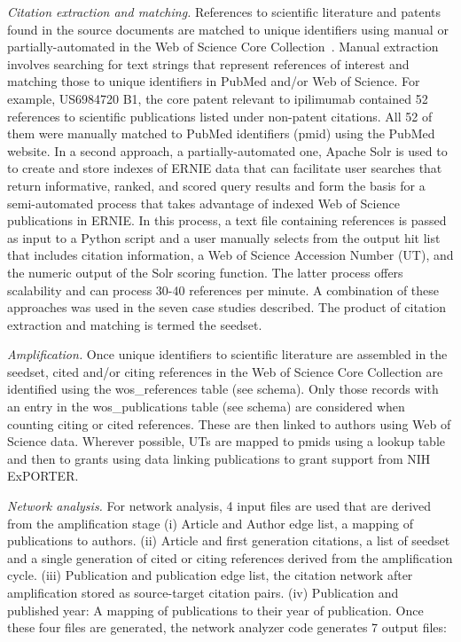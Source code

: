 \documentclass[review]{elsarticle}
\begin{document}
\emph {Citation extraction and matching.} References to scientific literature and patents found in the source documents are matched to unique identifiers using manual or partially-automated in the Web of Science Core Collection~\cite{Keserci2017}.  Manual extraction involves searching for text strings that represent references of interest and matching those to unique identifiers in PubMed and/or Web of Science. For example, US6984720 B1, the core patent relevant to ipilimumab contained 52 references to scientific publications listed under non-patent citations. All 52 of them were manually matched to PubMed identifiers (pmid) using the PubMed website. In a second approach, a partially-automated one, Apache Solr is used to to create and store indexes of ERNIE data that can facilitate user searches that return informative, ranked, and scored query results and form the basis for a semi-automated process that takes advantage of indexed Web of Science publications in ERNIE. In this process, a text file containing references is passed as input to a Python script and a user manually selects from the output hit list that includes citation information, a Web of Science Accession Number (UT), and the numeric output of the Solr scoring function. The latter process offers scalability and can process 30-40 references per minute. A combination of these approaches was used in the seven case studies described. The product of citation extraction and matching is termed the seedset.

\emph{Amplification.} Once unique identifiers to scientific literature are assembled in the seedset, cited and/or citing references in the Web of Science Core Collection are identified using the wos\_references table (see schema). Only those records with an entry in the wos\_publications table (see schema) are considered when counting citing or cited references. These are then linked to authors using Web of Science data. Wherever possible, UTs are mapped to pmids using a lookup table and then to grants using data linking publications to grant support from NIH ExPORTER. 

\emph{Network analysis.} For network  analysis, 4 input files are used that are derived from the amplification stage (i) Article and Author edge list, a mapping of publications to authors. (ii) Article and first generation citations, a list of seedset and a single generation of cited or citing references derived from the amplification cycle. (iii) Publication and publication edge list, the citation network after amplification stored as source-target citation pairs. (iv) Publication and published year: A mapping of publications to their year of publication. Once these four files are generated, the network analyzer code generates 7 output files:
\end{document}
